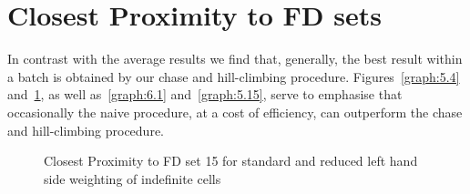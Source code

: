 \section{Closest Proximity to FD sets}

In contrast with the average results we find that, generally, the
best result within a batch is obtained by our chase and hill-climbing
procedure. Figures~\ref{graph:5.4} and~\ref{graph:5.5}, as well
as~\ref{graph:6.1} and~\ref{graph:5.15}, serve to emphasise that
occasionally the naive procedure, at a cost of efficiency, can
outperform the chase and hill-climbing procedure.


\begin{figure}
\begin{minipage}{7cm}
\centerline{}
\caption{\label{graph:5.4} {Closest Proximity to FD set 15 for
standard and reduced right hand side weighting of indefinite cells}}
\end{minipage}
\hfill
\begin{minipage}{7cm}
\centerline{}
\caption{\label{graph:5.5} {Closest Proximity to FD set 15 for
standard and reduced left hand side weighting of indefinite cells }}
\end{minipage}
\end{figure}

